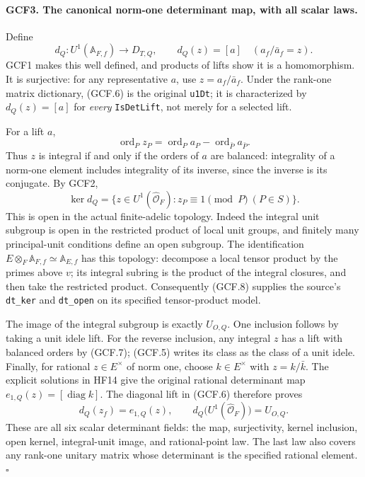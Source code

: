 \documentclass[11pt,a4paper]{article}
\numberwithin{equation}{section}
\theoremstyle{remark}\newtheorem{remark}[theorem]{Remark}
\begin{document}
\paragraph{GCF3. The canonical norm-one determinant map, with all scalar laws.}
\label{claim:GCF3}
Define
\[
 d_Q:U^1(\mathbb A_{F,f})\longrightarrow D_{T,Q},\qquad
                d_Q(z)=[a]\quad(a_f/\bar a_f=z).        \tag{GCF.6}
\]
GCF1 makes this well defined, and products of lifts show it is a
homomorphism.  It is surjective: for any representative \(a\), use
\(z=a_f/\bar a_f\).  Under the rank-one matrix dictionary, (GCF.6)
is the original \texttt{u1Dt}; it is characterized by
\(d_Q(z)=[a]\) for \emph{every} \texttt{Is\allowbreak Det\allowbreak Lift}, not merely for a
selected lift.

For a lift \(a\),
\[
 \operatorname{ord}_P z_P=
       \operatorname{ord}_P a_P-
                  \operatorname{ord}_{\bar P}a_{\bar P}.
 \tag{GCF.7}
\]
Thus \(z\) is integral if and only if the orders of \(a\) are
balanced: integrality of a norm-one element includes integrality of
its inverse, since the inverse is its conjugate.  By GCF2,
\[
 \ker d_Q=
 \{z\in U^1(\widehat{\mathcal O}_F):z_P\equiv1\pmod P
                                                    \ (P\in S)\}.
 \tag{GCF.8}
\]
This is open in the actual finite-adelic topology.  Indeed the integral
unit subgroup is open in the restricted product of local unit groups,
and finitely many principal-unit conditions define an open subgroup.
The identification \(E\otimes_F\mathbb A_{F,f}\simeq
\mathbb A_{E,f}\) has this topology: decompose a local tensor product
by the primes above \(v\); its integral subring is the product of the
integral closures, and then take the restricted product.  Consequently
(GCF.8) supplies the source's \texttt{dt\_\allowbreak ker} and \texttt{dt\_\allowbreak open}
on its specified tensor-product model.

The image of the integral subgroup is exactly \(U_{O,Q}\).
One inclusion follows by taking a unit idele lift.  For the reverse
inclusion, any integral \(z\) has a lift with balanced orders by
(GCF.7); (GCF.5) writes its class as the class of a unit idele.
Finally, for rational \(z\in E^{\times}\) of norm one, choose
\(k\in E^{\times}\) with \(z=k/\bar k\).  The explicit solutions
in HF14 give the original rational determinant map
\(e_{1,Q}(z)=[\operatorname{diag}k]\).  The diagonal lift in
(GCF.6) therefore proves
\[
 d_Q(z_f)=e_{1,Q}(z),\qquad
 d_Q\bigl(U^1(\widehat{\mathcal O}_F)\bigr)=U_{O,Q}.    \tag{GCF.9}
\]
These are all six scalar determinant fields: the map, surjectivity,
kernel inclusion, open kernel, integral-unit image, and rational-point
law.  The last law also covers any rank-one unitary matrix whose
determinant is the specified rational element.
\hfill\(\square\)
\end{document}

